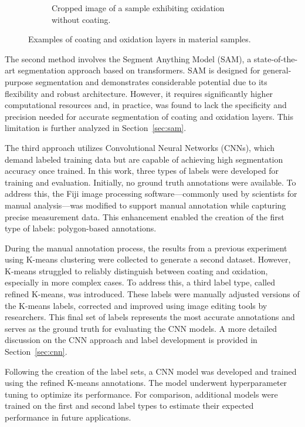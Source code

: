 \begin{figure}[H]
\begin{subfigure}{0.4\textwidth}
     \caption{Cropped image of a sample exhibiting oxidation without coating.} \label{fig:oxidation}        
     \label{fig:oxidation}
    \end{subfigure}
    \caption{Examples of coating and oxidation layers in material samples.}
    \label{fig:coating-oxidation}
\end{figure}


The second method involves the Segment Anything Model (SAM)\cite{kirillov2023segany}, a state-of-the-art segmentation approach based on transformers. SAM is designed for general-purpose segmentation and demonstrates considerable potential due to its flexibility and robust architecture. However, it requires significantly higher computational resources and, in practice, was found to lack the specificity and precision needed for accurate segmentation of coating and oxidation layers. This limitation is further analyzed in Section~\ref{sec:sam}.

The third approach utilizes Convolutional Neural Networks (CNNs), which demand labeled training data but are capable of achieving high segmentation accuracy once trained. In this work, three types of labels were developed for training and evaluation. Initially, no ground truth annotations were available. To address this, the Fiji image processing software—commonly used by scientists for manual analysis—was modified to support manual annotation while capturing precise measurement data. This enhancement enabled the creation of the first type of labels: polygon-based annotations.

During the manual annotation process, the results from a previous experiment using K-means clustering were collected to generate a second dataset. However, K-means struggled to reliably distinguish between coating and oxidation, especially in more complex cases. To address this, a third label type, called refined K-means, was introduced. These labels were manually adjusted versions of the K-means labels, corrected and improved using image editing tools by researchers. This final set of labels represents the most accurate annotations and serves as the ground truth for evaluating the CNN models. A more detailed discussion on the CNN approach and label development is provided in Section~\ref{sec:cnn}.

Following the creation of the label sets, a CNN model was developed and trained using the refined K-means annotations. The model underwent hyperparameter tuning to optimize its performance. For comparison, additional models were trained on the first and second label types to estimate their expected performance in future applications.

